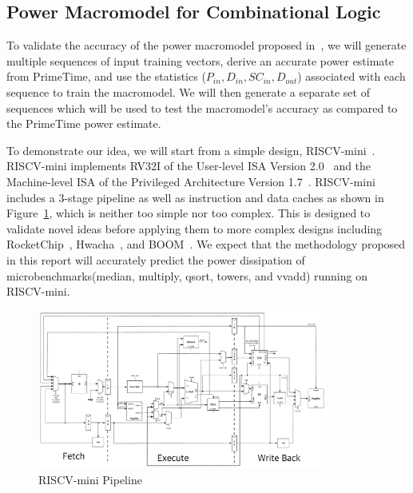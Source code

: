 \subsection{Power Macromodel for Combinational Logic}
To validate the accuracy of the power macromodel proposed in~\cite{Najm2000_2}, we will generate multiple sequences of input training vectors, derive an accurate power estimate from PrimeTime, and use the statistics ($P_{in}, D_{in}, SC_{in}, D_{out}$) associated with each sequence to train the macromodel. We will then generate a separate set of sequences which will be used to test the macromodel's accuracy as compared to the PrimeTime power estimate.


To demonstrate our idea, we will start from a simple design, RISCV-mini~\cite{riscv-mini}.
RISCV-mini implements RV32I of the User-level ISA Version 2.0~\cite{riscv-user-2.0} and
the Machine-level ISA of the Privileged Architecture Version 1.7~\cite{riscv-prev-1.7}.
RISCV-mini includes a 3-stage pipeline as well as instruction and data caches as shown
in Figure~\ref{fig:riscv_mini}, which is neither too simple nor too complex. This is designed
to validate novel ideas before applying them to more complex designs including
RocketChip~\cite{RocketChip}, Hwacha~\cite{Hwacha}, and BOOM~\cite{BOOM}.
We expect that the methodology proposed in this report will accurately predict
the power dissipation of microbenchmarks(median, multiply, qsort, towers, and vvadd) running on RISCV-mini.

\begin{figure}
	\centering
	\includegraphics[width=0.85\textwidth,height=\textheight,keepaspectratio]{images/riscv_mini.pdf}
	\caption{RISCV-mini Pipeline}
	\label{fig:riscv_mini}
\end{figure}